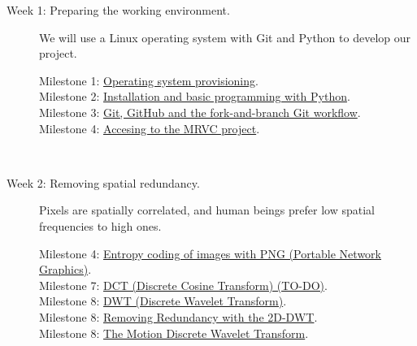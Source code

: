 \begin{description}
\item [Week 1: {\normalfont Preparing the working
    environment.}] We will use a Linux operating system with
  Git and Python to develop our project.
  \begin{description}
  \item [Milestone 1: {\normalfont \href{https://sistemas-multimedia.github.io/milestones/01-provisioning/}{Operating system provisioning}.}]
  \item [Milestone 2: {\normalfont \href{https://sistemas-multimedia.github.io/milestones/02-python/}{Installation and basic programming with Python}.}]
  \item [Milestone 3: {\normalfont \href{https://sistemas-multimedia.github.io/milestones/03-git/}{Git, GitHub and the fork-and-branch Git workflow}.}]
  \item [Milestone 4: {\normalfont \href{https://sistemas-multimedia.github.io/milestones/03-git/}{Accesing to the MRVC project}.}]
  \end{description}
  ~\newline
\item [Week 2: {\normalfont Removing spatial redundancy.}] Pixels are spatially correlated, and human beings prefer low spatial frequencies to high ones.
  \begin{description}
  \item [Milestone 4: {\normalfont \href{https://sistemas-multimedia.github.io/milestones/04-the_data/}{Entropy coding of images with PNG (Portable Network Graphics)}.}]
  \item [Milestone 7: {\normalfont \href{}{DCT (Discrete Cosine Transform) (TO-DO)}.}] %
  \item [Milestone 8: {\normalfont \href{https://sistemas-multimedia.github.io/milestones/07-DWT/}{DWT (Discrete Wavelet Transform)}.}] %
  \item [Milestone 8: {\normalfont \href{https://sistemas-multimedia.github.io/milestones/08-2D-DWT/}{Removing Redundancy with the 2D-DWT}.}] %
  \item [Milestone 8: {\normalfont \href{https://sistemas-multimedia.github.io/milestones/09-MDWT/}{The Motion Discrete Wavelet Transform}.}] %

\end{description}
\end{description}

